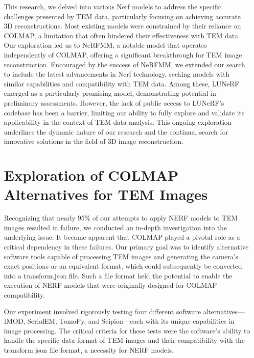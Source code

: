 This research, we delved into various Nerf models to address the specific challenges presented by TEM data, particularly focusing on achieving accurate 3D reconstructions. Most existing models were constrained by their reliance on COLMAP, a limitation that often hindered their effectiveness with TEM data. Our exploration led us to NeRFMM, a notable model that operates independently of COLMAP, offering a significant breakthrough for TEM image reconstruction. Encouraged by the success of NeRFMM, we extended our search to include the latest advancements in Nerf technology, seeking models with similar capabilities and compatibility with TEM data. Among these, LUNeRF emerged as a particularly promising model, demonstrating potential in preliminary assessments. However, the lack of public access to LUNeRF's codebase has been a barrier, limiting our ability to fully explore and validate its applicability in the context of TEM data analysis. This ongoing exploration underlines the dynamic nature of our research and the continual search for innovative solutions in the field of 3D image reconstruction.

\clearpage
\section{Exploration of COLMAP Alternatives for TEM Images}
Recognizing that nearly 95\% of our attempts to apply NERF models to TEM images resulted in failure, we conducted an in-depth investigation into the underlying issue. It became apparent that COLMAP played a pivotal role as a critical dependency in these failures. Our primary goal was to identify alternative software tools capable of processing TEM images and generating the camera's exact positions or an equivalent format, which could subsequently be converted into a transform.json file. Such a file format held the potential to enable the execution of NERF models that were originally designed for COLMAP compatibility.

\vspace{10pt}
Our experiment involved rigorously testing four different software alternatives—IMOD, SerialEM, TomoPy, and Scipion—each with its unique capabilities in image processing. The critical criteria for these tests were the software's ability to handle the specific data format of TEM images and their compatibility with the transform.json file format, a necessity for NERF models.
    
